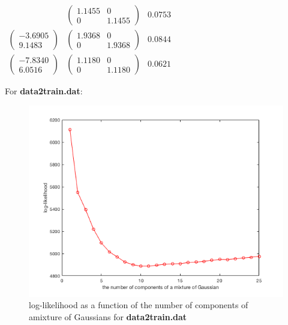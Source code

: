 \documentclass{article}
\begin{document}
\begin{math}
\begin{aligned}
& \left( \begin{array}{cc}   1.1455  & 0 \\   0 &  1.1455 
\end{array} \right) 
&   0.0753\\ %
\left( \begin{array}{c}   -3.6905 \\  9.1483
\end{array} \right) 
& \left( \begin{array}{cc}    1.9368 & 0 \\  0   &  1.9368
\end{array} \right) 
&   0.0844\\ %
\left( \begin{array}{c}  -7.8340 \\  6.0516
\end{array} \right)
& \left( \begin{array}{cc}    1.1180 & 0 \\   0 &  1.1180
\end{array} \right) 
&   0.0621 %
\end{aligned}
\end{math}


\newpage
For \textbf{data2train.dat}:


\begin{figure}[h!]
\centering
\includegraphics[scale=0.6]{fig/HW6P1_21.png}
\caption{log-likelihood as a function of the number of components of amixture of Gaussians for \textbf{data2train.dat}}
\end{figure}
\end{document}
